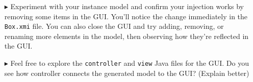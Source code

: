 \begin{itemize}
\vspace{1cm}

\item[$\blacktriangleright$] Experiment with your instance model and confirm your injection works by removing some items in the GUI.  You'll notice the change
immediately in the \texttt{Box.xmi} file. You can also close the GUI and try adding, removing, or renaming more elements in the model, then observing
how they're reflected in the GUI.

\item[$\blacktriangleright$] Feel free to explore the \texttt{controller} and \texttt{view} Java files for the GUI. Do you see how controller connects the
generated model to the GUI? (Explain better)

\end{itemize}
